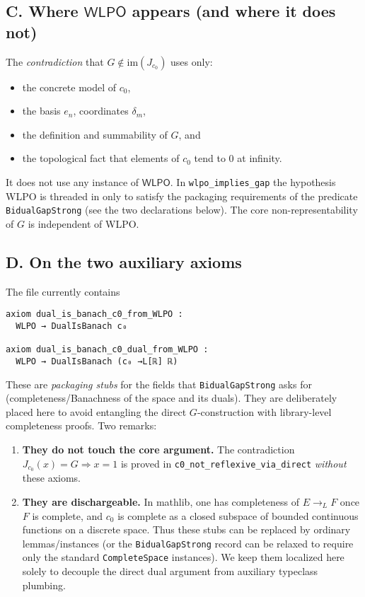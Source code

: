 \documentclass[11pt]{article}
\begin{document}
\subsection*{C. Where $\mathsf{WLPO}$ appears (and where it does not)}

The \emph{contradiction} that $G\notin \mathrm{im}(J_{c_0})$ uses only:
\begin{itemize}
\item the concrete model of $c_0$,
\item the basis $e_n$, coordinates $\delta_m$,
\item the definition and summability of $G$, and
\item the topological fact that elements of $c_0$ tend to 0 at infinity.
\end{itemize}

It does not use any instance of $\mathsf{WLPO}$.
In \verb|wlpo_implies_gap| the hypothesis WLPO is threaded in only to satisfy the packaging requirements of the predicate \verb|BidualGapStrong| (see the two declarations below). The core non-representability of $G$ is independent of WLPO.

\subsection*{D. On the two auxiliary axioms}

The file currently contains
\begin{verbatim}
axiom dual_is_banach_c0_from_WLPO :
  WLPO → DualIsBanach c₀

axiom dual_is_banach_c0_dual_from_WLPO :
  WLPO → DualIsBanach (c₀ →L[ℝ] ℝ)
\end{verbatim}

These are \emph{packaging stubs} for the fields that \verb|BidualGapStrong| asks for (completeness/Banachness of the space and its duals). They are deliberately placed here to avoid entangling the direct $G$-construction with library-level completeness proofs. Two remarks:
\begin{enumerate}
\item \textbf{They do not touch the core argument.}
The contradiction $J_{c_0}(x)=G\Rightarrow x=1$ is proved in \verb|c0_not_reflexive_via_direct| \emph{without} these axioms.
\item \textbf{They are dischargeable.}
In mathlib, one has completeness of $E\to_L F$ once $F$ is complete, and $c_0$ is complete as a closed subspace of bounded continuous functions on a discrete space. Thus these stubs can be replaced by ordinary lemmas/instances (or the \verb|BidualGapStrong| record can be relaxed to require only the standard \verb|CompleteSpace| instances). We keep them localized here solely to decouple the direct dual argument from auxiliary typeclass plumbing.
\end{enumerate}
\end{document}
